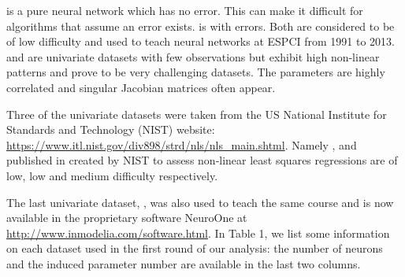  is a pure neural network which has no error. This can
make it difficult for algorithms that assume an error exists.
 is  with errors. Both are considered to
be of low difficulty and used to teach neural networks at ESPCI from
1991 to 2013.  and  are univariate datasets
with few observations but exhibit high non-linear patterns and prove to
be very challenging datasets. The parameters are highly correlated and
singular Jacobian matrices often appear.

Three of the univariate datasets were taken from the US National
Institute for Standards and Technology (NIST) website:
\url{https://www.itl.nist.gov/div898/strd/nls/nls_main.shtml}. Namely
,  and  published in
\citep[resp.]{rustnist96:Gauss1,rustnist96:Gauss2,rustnist96:Gauss3}
created by NIST to assess non-linear least squares regressions are of
low, low and medium difficulty respectively.

The last univariate dataset, , was also used to teach
the same course and is now available in the proprietary software
NeuroOne at \url{http://www.inmodelia.com/software.html}. In Table 1, we
list some information on each dataset used in the first round of our
analysis: the number of neurons and the induced parameter number are
available in the last two columns.


